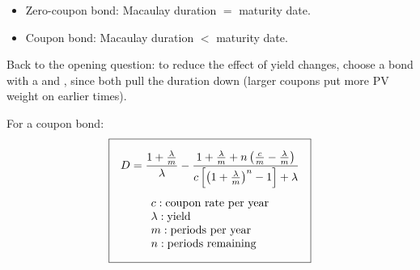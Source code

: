 \begin{itemize}
    \item Zero-coupon bond: Macaulay duration $=$ maturity date.
    \item Coupon bond: Macaulay duration $<$ maturity date.
\end{itemize}
Back to the opening question: to reduce the effect of yield changes, choose a bond with a  and , since both pull the duration down (larger coupons put more PV weight on earlier times).

For a coupon bond:
\[\boxed{\begin{gathered}
    D = \frac{1+\frac{\lambda}{m}}{\lambda} - \frac{1 + \frac{\lambda}{m} + n\left(\frac{c}{m} - \frac{\lambda}{m}\right)}{c\left[\left(1+\frac{\lambda}{m}\right)^n - 1\right] + \lambda}\\[4pt]
    \begin{array}{@{}l@{}}
        c: \text{coupon rate per year}\\
        \lambda: \text{yield}\\
        m: \text{periods per year}\\
        n: \text{periods remaining}
    \end{array}
\end{gathered}}\]

